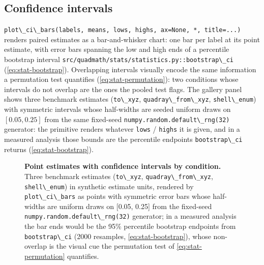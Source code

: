 \documentclass[
  10pt,
]{article}
\makeatletter
\newcommand{\passthrough}[1]{#1}
\newcommand*\pandocbounded[1]{%
  \sbox\pandoc@box{#1}%
  \Gscale@div\@tempa{\textheight}{\dimexpr\ht\pandoc@box+\dp\pandoc@box\relax}%
  \Gscale@div\@tempb{\linewidth}{\wd\pandoc@box}%
  \ifdim\@tempb\p@<\@tempa\p@\let\@tempa\@tempb\fi%
  \ifdim\@tempa\p@<\p@\scalebox{\@tempa}{\usebox\pandoc@box}%
  \else\usebox{\pandoc@box}%
  \fi%
}
\makeatother
\begin{document}
\subsection{Confidence intervals}\label{confidence-intervals}

\passthrough{\lstinline!plot\_ci\_bars(labels, means, lows, highs, ax=None, *, title=...)!}
renders paired estimates as a bar-and-whisker chart: one bar per label
at its point estimate, with error bars spanning the low and high ends of
a percentile bootstrap interval
\passthrough{\lstinline!src/quadmath/stats/statistics.py::bootstrap\_ci!}
(\eqref{eq:stat-bootstrap}). Overlapping intervals visually encode the
same information a permutation test quantifies
(\eqref{eq:stat-permutation}): two conditions whose intervals do not
overlap are the ones the pooled test flags. The gallery panel shows
three benchmark estimates (\passthrough{\lstinline!to\_xyz!},
\passthrough{\lstinline!quadray\_from\_xyz!},
\passthrough{\lstinline!shell\_enum!}) with symmetric intervals whose
half-widths are seeded uniform draws on \([0.05, 0.25]\) from the same
fixed-seed \passthrough{\lstinline!numpy.random.default\_rng(32)!}
generator: the primitive renders whatever \passthrough{\lstinline!lows!}
/ \passthrough{\lstinline!highs!} it is given, and in a measured
analysis those bounds are the percentile endpoints
\passthrough{\lstinline!bootstrap\_ci!} returns
(\eqref{eq:stat-bootstrap}).

\begin{figure}
\centering
\pandocbounded{\includegraphics[keepaspectratio,alt={Point estimates with confidence intervals by condition. Three benchmark estimates (to\_xyz, quadray\_from\_xyz, shell\_enum) in synthetic estimate units, rendered by plot\_ci\_bars as points with symmetric error bars whose half-widths are uniform draws on {[}0.05, 0.25{]} from the fixed-seed numpy.random.default\_rng(32) generator; in a measured analysis the bar ends would be the 95\% percentile bootstrap endpoints from bootstrap\_ci (2000 resamples, ), whose non-overlap is the visual cue the permutation test of  quantifies.}]{../output/figures/stats_gallery_ci.png}}
\caption{\textbf{Point estimates with confidence intervals by
condition.} Three benchmark estimates
(\protect\passthrough{\lstinline!to\_xyz!},
\protect\passthrough{\lstinline!quadray\_from\_xyz!},
\protect\passthrough{\lstinline!shell\_enum!}) in synthetic estimate
units, rendered by \protect\passthrough{\lstinline!plot\_ci\_bars!} as
points with symmetric error bars whose half-widths are uniform draws on
{[}0.05, 0.25{]} from the fixed-seed
\protect\passthrough{\lstinline!numpy.random.default\_rng(32)!}
generator; in a measured analysis the bar ends would be the 95\%
percentile bootstrap endpoints from
\protect\passthrough{\lstinline!bootstrap\_ci!} (2000 resamples,
\eqref{eq:stat-bootstrap}), whose non-overlap is the visual cue the
permutation test of \eqref{eq:stat-permutation} quantifies.}
\end{figure}
\end{document}
